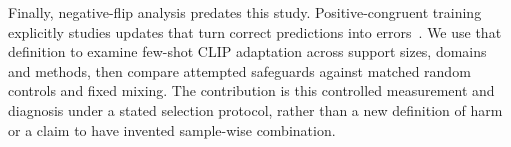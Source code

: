 Finally, negative-flip analysis predates this study. Positive-congruent training explicitly studies updates that turn correct predictions into errors~\citep{yan2021flips}. We use that definition to examine few-shot CLIP adaptation across support sizes, domains and methods, then compare attempted safeguards against matched random controls and fixed mixing. The contribution is this controlled measurement and diagnosis under a stated selection protocol, rather than a new definition of harm or a claim to have invented sample-wise combination.
